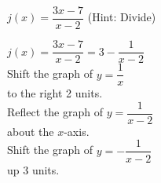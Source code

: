 {$j(x) = \dfrac{3x - 7}{x - 2}$ (Hint: Divide) }
{$j(x) = \dfrac{3x - 7}{x - 2} = 3 - \dfrac{1}{x - 2}$\\
Shift the graph of $y = \dfrac{1}{x}$\\
to the right 2 units.\\
Reflect the graph of $y = \dfrac{1}{x - 2}$\\
about the $x$-axis.\\
Shift the graph of $y = -\dfrac{1}{x - 2}$\\
up 3 units.


\begin{center}
\end{center}}